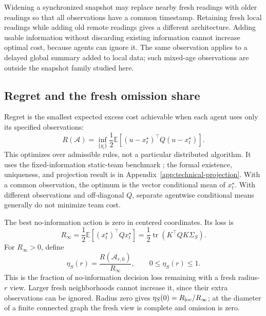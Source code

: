 \documentclass[11pt]{article}
\begin{document}
Widening a synchronized snapshot may replace nearby fresh readings with
older readings so that all observations have a common timestamp. Retaining
fresh local readings while adding old remote readings gives a different
architecture. Adding usable information without discarding existing
information cannot increase optimal cost, because agents can ignore it.
The same observation applies to a delayed global summary added to local data;
such mixed-age observations are outside the snapshot family studied here.

\subsection{Regret and the fresh omission share}
\label{subsec:architecture_regret}

Regret is the smallest expected excess cost achievable when each agent uses
only its specified observations:
\begin{equation}
R(\mathcal A)=\inf_{\{g_i\}}\frac12
\mathbb E[(u-x_t^\star)^\top Q(u-x_t^\star)].
\label{eq:architecture_regret}
\end{equation}
This optimizes over admissible rules, not a particular distributed algorithm.
It uses the fixed-information static-team benchmark
\cite{radner1962team,krainak1982staticII}; the formal existence, uniqueness,
and projection result is in Appendix~\ref{app:technical-projection}.
With a common observation, the optimum is the vector conditional mean of
$x_t^\star$. With different observations and off-diagonal $Q$, separate
agentwise conditional means generally do not minimize team cost.

The best no-information action is zero in centered coordinates. Its loss is
\begin{equation}
R_\infty=\frac12\mathbb E[(x_t^\star)^\top Qx_t^\star]
=\frac12\operatorname{tr}(K^\top QK\Sigma_S).
\label{eq:Rinf_general}
\end{equation}
For $R_\infty>0$, define
\begin{equation}
\eta_S(r)=\frac{R(\mathcal A_{r,0})}{R_\infty},\qquad 0\le\eta_S(r)\le1.
\label{eq:eta_S_definition}
\end{equation}
This is the fraction of no-information decision loss remaining with a fresh
radius-$r$ view. Larger fresh neighborhoods cannot increase it, since their
extra observations can be ignored. Radius zero gives
$\eta_S(0)=R_{\rm loc}/R_\infty$; at the diameter of a finite connected
graph the fresh view is complete and omission is zero.
\end{document}
